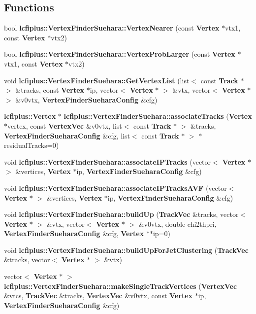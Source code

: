 \subsection*{Functions}
\begin{DoxyCompactItemize}
\item 
bool {\bf lcfiplus\-::\-Vertex\-Finder\-Suehara\-::\-Vertex\-Nearer} (const {\bf Vertex} $\ast$vtx1, const {\bf Vertex} $\ast$vtx2)
\item 
bool {\bf lcfiplus\-::\-Vertex\-Finder\-Suehara\-::\-Vertex\-Prob\-Larger} (const {\bf Vertex} $\ast$vtx1, const {\bf Vertex} $\ast$vtx2)
\item 
void {\bf lcfiplus\-::\-Vertex\-Finder\-Suehara\-::\-Get\-Vertex\-List} (list$<$ const {\bf Track} $\ast$ $>$ \&tracks, const {\bf Vertex} $\ast$ip, vector$<$ {\bf Vertex} $\ast$ $>$ \&vtx, vector$<$ {\bf Vertex} $\ast$ $>$ \&v0vtx, {\bf Vertex\-Finder\-Suehara\-Config} \&cfg)
\item 
{\bf lcfiplus\-::\-Vertex} $\ast$ {\bf lcfiplus\-::\-Vertex\-Finder\-Suehara\-::associate\-Tracks} ({\bf Vertex} $\ast$vertex, const {\bf Vertex\-Vec} \&v0vtx, list$<$ const {\bf Track} $\ast$ $>$ \&tracks, {\bf Vertex\-Finder\-Suehara\-Config} \&cfg, list$<$ const {\bf Track} $\ast$ $>$ $\ast$residual\-Tracks=0)
\item 
void {\bf lcfiplus\-::\-Vertex\-Finder\-Suehara\-::associate\-I\-P\-Tracks} (vector$<$ {\bf Vertex} $\ast$ $>$ \&vertices, {\bf Vertex} $\ast$ip, {\bf Vertex\-Finder\-Suehara\-Config} \&cfg)
\item 
void {\bf lcfiplus\-::\-Vertex\-Finder\-Suehara\-::associate\-I\-P\-Tracks\-A\-V\-F} (vector$<$ {\bf Vertex} $\ast$ $>$ \&vertices, {\bf Vertex} $\ast$ip, {\bf Vertex\-Finder\-Suehara\-Config} \&cfg)
\item 
void {\bf lcfiplus\-::\-Vertex\-Finder\-Suehara\-::build\-Up} ({\bf Track\-Vec} \&tracks, vector$<$ {\bf Vertex} $\ast$ $>$ \&vtx, vector$<$ {\bf Vertex} $\ast$ $>$ \&v0vtx, double chi2thpri, {\bf Vertex\-Finder\-Suehara\-Config} \&cfg, {\bf Vertex} $\ast$$\ast$ip=0)
\item 
void {\bf lcfiplus\-::\-Vertex\-Finder\-Suehara\-::build\-Up\-For\-Jet\-Clustering} ({\bf Track\-Vec} \&tracks, vector$<$ {\bf Vertex} $\ast$ $>$ \&vtx)
\item 
vector$<$ {\bf Vertex} $\ast$ $>$ {\bf lcfiplus\-::\-Vertex\-Finder\-Suehara\-::make\-Single\-Track\-Vertices} ({\bf Vertex\-Vec} \&vtcs, {\bf Track\-Vec} \&tracks, {\bf Vertex\-Vec} \&v0vtx, const {\bf Vertex} $\ast$ip, {\bf Vertex\-Finder\-Suehara\-Config} \&cfg)
$$
\end{DoxyCompactItemize}
